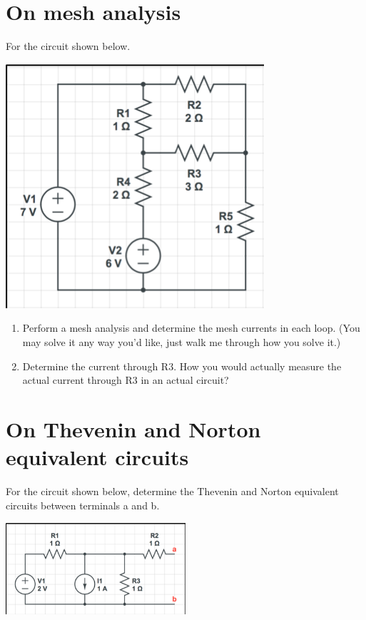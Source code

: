 \documentclass[11pt]{book}
\begin{document}
\section{On mesh analysis}
For the circuit shown below.
\begin{center}
	\includegraphics{figures/hw2.03.png}
\end{center}
\begin{enumerate}
	\item Perform a mesh analysis and determine the mesh currents in each loop. (You may solve it any way you’d like, just walk me through how you solve it.)
	\item Determine the current through R3. How you would actually measure the actual current through R3 in an actual circuit?
\end{enumerate}



\section{On Thevenin and Norton equivalent circuits}

For the circuit shown below, determine the Thevenin and Norton equivalent circuits between terminals a and b.
\begin{center}
	\includegraphics[width=0.5\textwidth]{figures/hw2.04.png}
\end{center}
\end{document}
